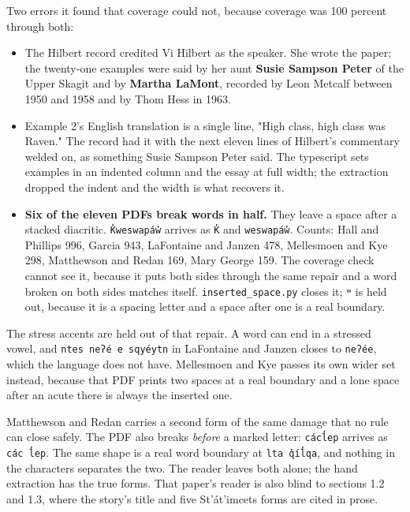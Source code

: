 Two errors it found that coverage could not, because coverage was 100 percent through both:

\begin{itemize}
\item The Hilbert record credited Vi Hilbert as the speaker. She wrote the paper; the twenty-one examples were said by her aunt \textbf{Susie Sampson Peter} of the Upper Skagit and by \textbf{Martha LaMont}, recorded by Leon Metcalf between 1950 and 1958 and by Thom Hess in 1963.
\item Example 2's English translation is a single line, "High class, high class was Raven." The record had it with the next eleven lines of Hilbert's commentary welded on, as something Susie Sampson Peter said. The typescript sets examples in an indented column and the essay at full width; the extraction dropped the indent and the width is what recovers it.
\end{itemize}

\begin{itemize}
\item \textbf{Six of the eleven PDFs break words in half.} They leave a space after a stacked diacritic. \texttt{K̓weswapáw̓} arrives as \texttt{K̓} and \texttt{weswapáw̓}. Counts: Hall and Phillips 996, Garcia 943, LaFontaine and Janzen 478, Mellesmoen and Kye 298, Matthewson and Redan 169, Mary George 159. The coverage check cannot see it, because it puts both sides through the same repair and a word broken on both sides matches itself. \texttt{inserted\_\allowbreak{}space.\allowbreak{}py} closes it; \texttt{ʷ} is held out, because it is a spacing letter and a space after one is a real boundary.
\end{itemize}

The stress accents are held out of that repair. A word can end in a stressed vowel, and \texttt{ntes neʔé e sqyéytn} in LaFontaine and Janzen closes to \texttt{neʔée}, which the language does not have. Mellesmoen and Kye passes its own wider set instead, because that PDF prints two spaces at a real boundary and a lone space after an acute there is always the inserted one.

Matthewson and Redan carries a second form of the same damage that no rule can close safely. The PDF also breaks \emph{before} a marked letter: \texttt{cácl̓ep} arrives as \texttt{các l̓ep}. The same shape is a real word boundary at \texttt{lta q̓íl̓qa}, and nothing in the characters separates the two. The reader leaves both alone; the hand extraction has the true forms. That paper's reader is also blind to sections 1.2 and 1.3, where the story's title and five St'át'imcets forms are cited in prose.

